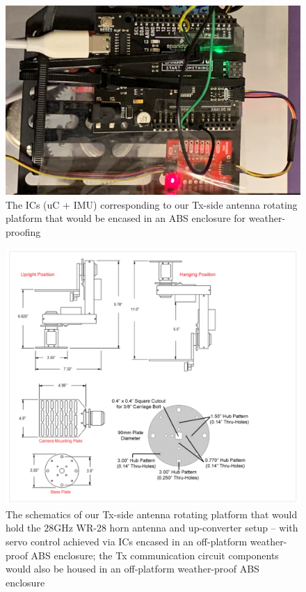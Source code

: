 \documentclass[12pt]{article}
\newcommand{\areaofinterestfigwidth}{1.0\textwidth}
\begin{document}
    \begin{figure}
        \centering
        \includegraphics[width=\areaofinterestfigwidth]{figs/Prototype_Integrated_Design_3.jpg}
        \caption{The ICs (uC + IMU) corresponding to our Tx-side antenna rotating platform that would be encased in an ABS enclosure for weather-proofing}
        \label{fig:Tx-ICs}
    \end{figure}
    \begin{figure}
        \centering
        \includegraphics[width=\areaofinterestfigwidth]{figs/PT785-S_Schematics.png}
        \caption{The schematics of our Tx-side antenna rotating platform that would hold the $28$GHz WR-28 horn antenna and up-converter setup -- with servo control achieved via ICs encased in an off-platform weather-proof ABS enclosure; the Tx communication circuit components would also be housed in an off-platform weather-proof ABS enclosure}
        \label{fig:schematics}
    \end{figure}
\end{document}
